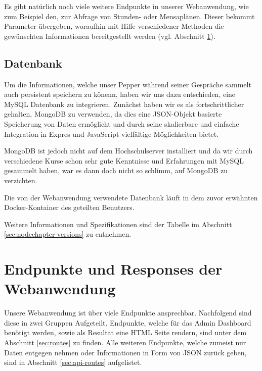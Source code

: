 Es gibt natürlich noch viele weitere Endpunkte in unserer Webanwendung, wie zum Beispiel den, zur Abfrage von Stunden- oder Mensaplänen. Dieser bekommt Parameter übergeben, woraufhin mit Hilfe verschiedener Methoden die gewünschten Informationen bereitgestellt werden (vgl. Abschnitt \ref{sec:nodechapter-implementation-routes}).\\

\subsection{Datenbank}
\label{sec:nodechapter-database}
Um die Informationen, welche unser Pepper während seiner Gespräche sammelt auch persistent speichern zu könenn, haben wir uns dazu entschieden, eine MySQL Datenbank zu integrieren. Zunächst haben wir es als fortschrittlicher gehalten, MongoDB zu verwenden, da dies eine JSON-Objekt basierte Speicherung von Daten ermöglicht und durch seine skalierbare und einfache Integration in Expres und JavaScript vielfältige Möglichkeiten bietet.

MongoDB ist jedoch nicht auf dem Hochschulserver installiert und da wir durch verschiedene Kurse schon sehr gute Kenntnisse und Erfahrungen mit MySQL gesammelt haben, war es dann doch nicht so schlimm, auf MongoDB zu verzichten.

Die von der Webanwendung verwendete Datenbank läuft in dem zuvor erwähnten Docker-Kontainer des geteilten Benutzers.

Weitere Informationen und Spezifikationen sind der Tabelle im Abschnitt \ref{sec:nodechapter-versions} zu entnehmen.


\newpage
\section{Endpunkte und Responses der Webanwendung}
\label{sec:nodechapter-implementation-routes}
Unsere Webanwendung ist über viele Endpunkte ansprechbar. Nachfolgend sind diese in zwei Gruppen Aufgeteilt. Endpunkte, welche für das Admin Dashboard benötigt werden, sowie als Resultat eine HTML Seite rendern, sind unter dem Abschnitt \ref{sec:routes} zu finden. Alle weiteren Endpunkte, welche zumeist nur Daten entgegen nehmen oder Informationen in Form von JSON zurück geben, sind in Abschnitt \ref{sec:api-routes} aufgelistet.

